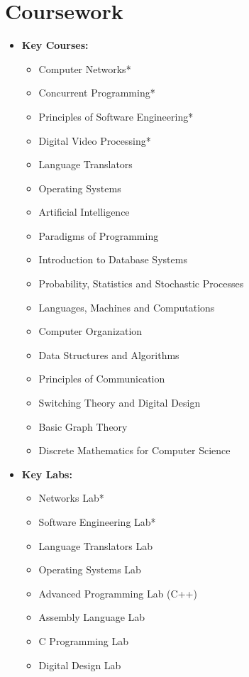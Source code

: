 \documentclass[letterpaper,11pt]{resume}
\begin{document}
\section{Coursework}
\begin{multicols}{2}
{{ \begin{itemize}
    \item{\bf Key Courses:}
     {\begin{itemize}
	\item Computer Networks*
	\item Concurrent Programming*
	\item Principles of Software Engineering*
	\item Digital Video Processing*
	\item Language Translators
	\item Operating Systems
	\item Artificial Intelligence
	\item Paradigms of Programming
	\item Introduction to Database Systems
	
        \item Probability, Statistics and Stochastic Processes
	\item Languages, Machines and Computations
	\item {Computer Organization}
        \item {Data Structures and Algorithms}
        \item Principles of Communication
        
        \item  {Switching Theory and Digital Design}
	\item {Basic Graph Theory}
	\item {Discrete Mathematics for Computer Science}
	
        
           \end{itemize}
      }	
      \end{itemize}
    }
 \begin{itemize}
 \item {\bf Key Labs:}
 {
  \begin{itemize}
    \item Networks Lab*
    \item Software Engineering Lab*
    \item Language Translators Lab
    \item Operating Systems Lab
    \item Advanced Programming Lab (C++) \let\thefootnote\relax{} 
    \item Assembly Language Lab
    \item {C Programming Lab}
    \item {Digital Design Lab}
     

\end{itemize}}
\end{itemize}}
\end{multicols}
\end{document}
